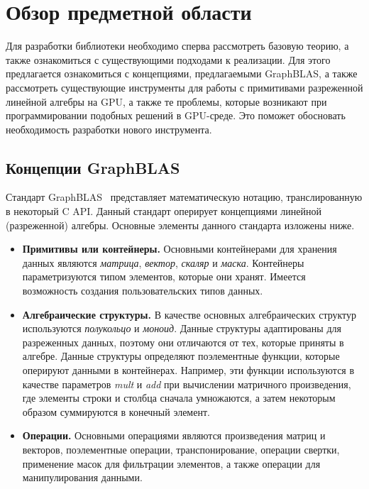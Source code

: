 \section{Обзор предметной области}

Для разработки библиотеки необходимо сперва рассмотреть базовую теорию, а также ознакомиться с существующими подходами к реализации. Для этого предлагается ознакомиться с концепциями, предлагаемыми GraphBLAS, а также рассмотреть существующие инструменты для работы с примитивами разреженной линейной алгебры на GPU, а также те проблемы, которые возникают при программировании подобных решений в GPU-среде. Это поможет обосновать необходимость разработки нового инструмента.

\subsection{Концепции GraphBLAS}

Стандарт GraphBLAS~\cite{paper:graphblas_foundations} представляет математическую нотацию, транслированную в некоторый C API. Данный стандарт оперирует концепциями линейной (разреженной) алгебры. Основные элементы данного стандарта изложены ниже.

\begin{itemize}
    \item \textbf{Примитивы или контейнеры.} Основными контейнерами для хранения данных являются \textit{матрица}, \textit{вектор}, \textit{скаляр} и \textit{маска}. Контейнеры параметризуются типом элементов, которые они хранят. Имеется возможность создания пользовательских типов данных. 
    \item \textbf{Алгебраические структуры.} В качестве основных алгебраических структур используются \textit{полукольцо} и \textit{моноид}. Данные структуры адаптированы для разреженных данных, поэтому они отличаются от тех, которые приняты в алгебре.
    Данные структуры определяют поэлементные функции, которые оперируют данными в контейнерах. Например, эти функции используются в качестве параметров \textit{mult} и \textit{add} при вычислении матричного произведения, где элементы строки и столбца сначала умножаются, а затем некоторым образом суммируются в конечный  элемент. 
    \item \textbf{Операции.} Основными операциями являются произведения матриц и векторов, поэлементные операции, транспонирование, операции свертки, применение масок для фильтрации элементов, а также операции для манипулирования данными.
\end{itemize}

